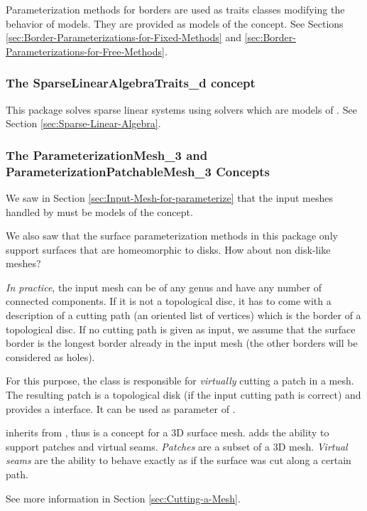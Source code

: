Parameterization methods for
borders are used as traits classes modifying the behavior of
 models.
They are provided as models of the  concept.
See Sections \ref{sec:Border-Parameterizations-for-Fixed-Methods}
and \ref{sec:Border-Parameterizations-for-Free-Methods}.


\subsubsection{The SparseLinearAlgebraTraits\_d concept}

This package solves sparse linear systems using solvers which are models
of .
See Section \ref{sec:Sparse-Linear-Algebra}.


\subsubsection{The ParameterizationMesh\_3 and ParameterizationPatchableMesh\_3 Concepts}

We saw in Section \ref{sec:Input-Mesh-for-parameterize}
that the input meshes handled by 
must be models of the  concept.

We also saw that the surface parameterization methods in this package only support
surfaces that are homeomorphic to disks. How about non disk-like meshes?

\emph{In practice}, the input mesh can be of any genus and
have any number of connected components. If it is not a topological
disc, it has to come with a description of a cutting path (an oriented list of
vertices) which is the border of a topological disc.  If no cutting path is
given as input, we assume that the surface border is the longest border already
in the input mesh (the other borders will be considered as holes).

For this purpose, the
class is responsible for \emph{virtually} cutting
a patch in a  mesh.
The resulting patch is a topological
disk (if the input cutting path is correct)
and provides a  interface. It can be used as
parameter of .

 inherits from ,
thus is a concept for a 3D surface mesh.
 adds the ability to support patches and
virtual seams. \emph{Patches} are a subset of a 3D mesh.
\emph{Virtual seams} are the ability
to behave exactly as if the surface was cut along a certain path.

See more information in Section \ref{sec:Cutting-a-Mesh}.
